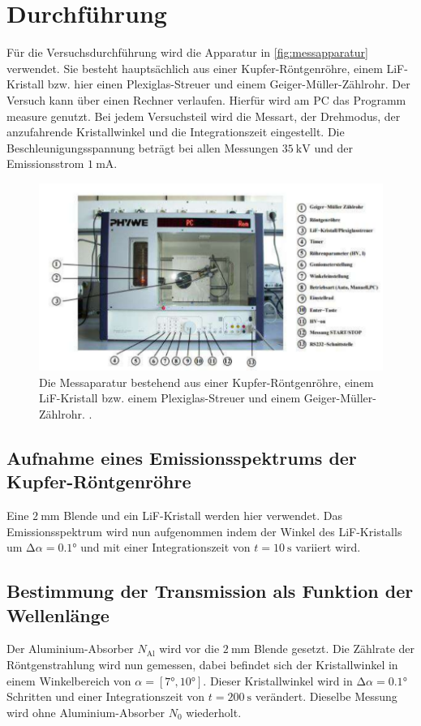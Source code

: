 \section{Durchführung}
\label{sec:Durchführung}

Für die Versuchsdurchführung wird die Apparatur in \autoref{fig:messapparatur} verwendet.
Sie besteht hauptsächlich aus einer Kupfer-Röntgenröhre, einem LiF-Kristall bzw. hier einen Plexiglas-Streuer und einem Geiger-Müller-Zählrohr.
Der Versuch kann über einen Rechner verlaufen.
Hierfür wird am PC das Programm measure genutzt.
Bei jedem Versuchsteil wird die Messart, der Drehmodus, der anzufahrende Kristallwinkel und die Integrationszeit eingestellt.
Die Beschleunigungsspannung beträgt bei allen Messungen $\SI{35}{\kilo\volt}$ und der Emissionsstrom $\SI{1}{\milli\ampere}$.

\begin{figure}
    \centering
    \includegraphics[width=\textwidth]{bilder/messaparatur.pdf}
    \caption{Die Messaparatur bestehend aus einer Kupfer-Röntgenröhre, einem LiF-Kristall bzw.
            einem Plexiglas-Streuer und einem Geiger-Müller-Zählrohr. \cite{anleitung}. }
    \label{fig:messapparatur}
\end{figure}

\subsection{Aufnahme eines Emissionsspektrums der Kupfer-Röntgenröhre}
Eine $\SI{2}{\milli\metre}$ Blende und ein LiF-Kristall werden hier verwendet.
Das Emissionsspektrum wird nun aufgenommen indem der Winkel des LiF-Kristalls um $\increment \alpha = 0.1°$ und mit einer Integrationszeit von $t=\SI{10}{\second}$ variiert wird.

\subsection{Bestimmung der Transmission als Funktion der Wellenlänge}
Der Aluminium-Absorber $N_\text{Al}$ wird vor die $\SI{2}{\milli\metre}$ Blende gesetzt.
Die Zählrate der Röntgenstrahlung wird nun gemessen, dabei befindet sich der Kristallwinkel in einem Winkelbereich von $\alpha = [7°,10°]$.
Dieser Kristallwinkel wird in $\increment \alpha = 0.1°$ Schritten und einer Integrationszeit von $t = \SI{200}{\second}$ verändert.
Dieselbe Messung wird ohne Aluminium-Absorber $N_0$ wiederholt.

